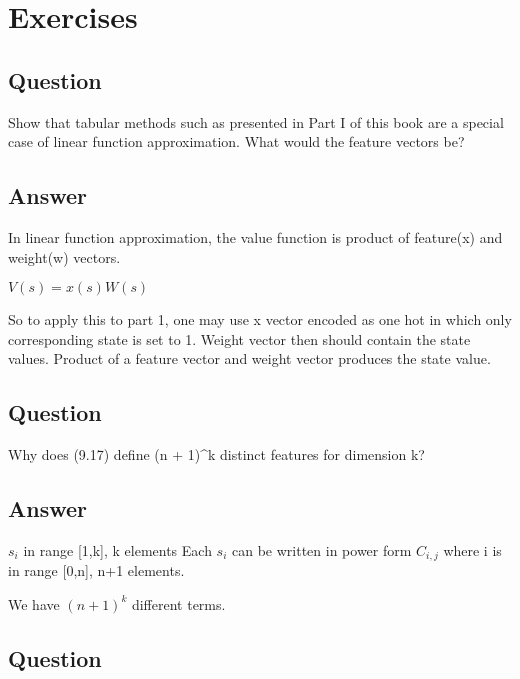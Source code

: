 \documentclass[11pt]{article}
\begin{document}
    \maketitle
    \setcounter{section}{8}


    \section{Exercises}

    \subsection{Question}

    Show that tabular methods such as presented in Part I of this book are a special case of linear function approximation.
    What would the feature vectors be?

    \subsection*{Answer}

    In linear function approximation, the value function is product of feature(x) and weight(w) vectors.

    \noindention $ V(s) = x(s) W(s)$

    So to apply this to part 1, one may use x vector encoded as one hot in which only corresponding state is set to 1.
    Weight vector then should contain the state values.
    Product of a feature vector and weight vector produces the state value.

    \subsection{Question}

    Why does (9.17) define (n + 1)^k distinct features for dimension k?

    \subsection*{Answer}

    $s_i$ in range [1,k], k elements
    Each $s_i$ can be written in power form $C_{i,j}$ where i is in range [0,n], n+1 elements.

    We have $ (n+1)^k $ different terms.

    \subsection{Question}
\end{document}
